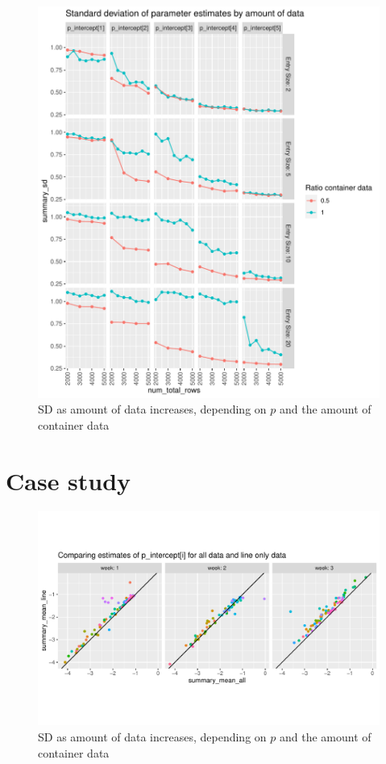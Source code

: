 \documentclass{article}
\begin{document}
\begin{figure}[h!]
\includegraphics[width=\textwidth]{../visualisations/figures/sim_study_pint_vs_data_vs_entry_size.pdf}
\caption{SD as amount of data increases, depending on \(p\) and the amount of container data}
\label{fig:SD_est_simulated}
\end{figure}

\section{Case study}
\begin{figure}[h!]
\includegraphics[width=\textwidth]{../visualisations/figures/p_int_est_all_vs_line_data.pdf}
\caption{SD as amount of data increases, depending on \(p\) and the amount of container data}
\label{fig:SD_est_simulated}
\end{figure}
\end{document}
